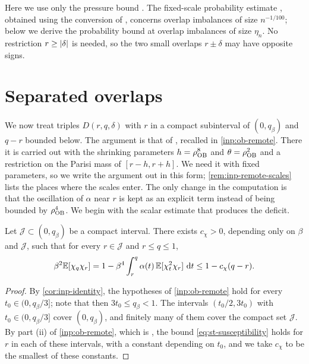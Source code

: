 Here we use only the pressure bound \cite[(4.20)]{oai-barriers}. The fixed-scale probability estimate \cite[Lemma~4.1]{oai-barriers}, obtained using the conversion of \cite[Lemma~4.2]{oai-barriers}, concerns overlap imbalances of size $n^{-1/100}$; below we derive the probability bound at overlap imbalances of size $\eta_n$. No restriction $r\ge\lvert \delta\rvert$ is needed, so the two small overlaps $r\pm\delta$ may have opposite signs.

\section{Separated overlaps}\label{sec:st-remote}

We now treat triples $D(r,q,\delta)$ with $r$ in a compact subinterval of $(0,q_\beta)$ and $q-r$ bounded below. The argument is that of \cite[Section~7, Steps~1--8]{oai-barriers}, recalled in \cref{inp:ob-remote}. There it is carried out with the shrinking parameters $h=\rho_{\rm OB}^8$ and $\theta=\rho_{\rm OB}^2$ and a restriction on the Parisi mass of $[r-h,r+h]$. We need it with fixed parameters, so we write the argument out in this form; \cref{rem:inp-remote-scales} lists the places where the scales enter. The only change in the computation is that the oscillation of $\alpha$ near $r$ is kept as an explicit term instead of being bounded by $\rho_{\rm OB}^4$. We begin with the scalar estimate that produces the deficit.

\begin{lemma}\label{lem:st-susceptibility}
Let $\mathcal J\subset(0,q_\beta)$ be a compact interval. There exists $c_\chi>0$, depending only on $\beta$ and $\mathcal J$, such that for every $r\in\mathcal J$ and $r\le q\le1$,
\begin{equation}\label{eq:st-susceptibility}
 \beta^2\mathbb E[\chi_q\chi_r]=1-\beta^4\int_r^q\alpha(t)\,\mathbb E[\chi_t^2\chi_r]\,\,\mathrm d t\le1-c_\chi(q-r).
\end{equation}
\end{lemma}

\begin{proof}
By \cref{cor:inp-identity}, the hypotheses of \cref{inp:ob-remote} hold for every $t_0\in(0,q_\beta/3]$; note that then $3t_0\le q_\beta<1$. The intervals $(t_0/2,3t_0)$ with $t_0\in(0,q_\beta/3]$ cover $(0,q_\beta)$, and finitely many of them cover the compact set $\mathcal J$. By part (ii) of \cref{inp:ob-remote}, which is \cite[(7.31)]{oai-barriers}, the bound \eqref{eq:st-susceptibility} holds for $r$ in each of these intervals, with a constant depending on $t_0$, and we take $c_\chi$ to be the smallest of these constants.
\end{proof}


